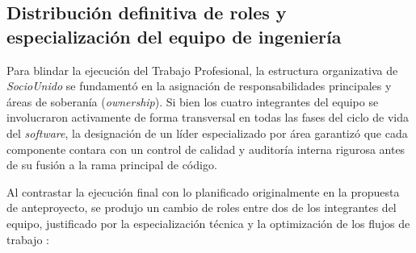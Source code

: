 \documentclass[conference, a4paper]{IEEEtran}
\begin{document}
\subsection{Distribuci\'on definitiva de roles y especializaci\'on del equipo de ingenier\'ia}
Para blindar la ejecuci\'on del Trabajo Profesional, la estructura organizativa de \textit{SocioUnido} se fundament\'o en la asignaci\'on de responsabilidades principales y \'areas de soberan\'ia (\textit{ownership}). Si bien los cuatro integrantes del equipo se involucraron activamente de forma transversal en todas las fases del ciclo de vida del \textit{software}, la designaci\'on de un l\'ider especializado por \'area garantiz\'o que cada componente contara con un control de calidad y auditor\'ia interna rigurosa antes de su fusi\'on a la rama principal de c\'odigo.

Al contrastar la ejecuci\'on final con lo planificado originalmente en la propuesta de anteproyecto, se produjo un cambio de roles entre dos de los integrantes del equipo, justificado por la especializaci\'on t\'ecnica y la optimizaci\'on de los flujos de trabajo :
\end{document}
